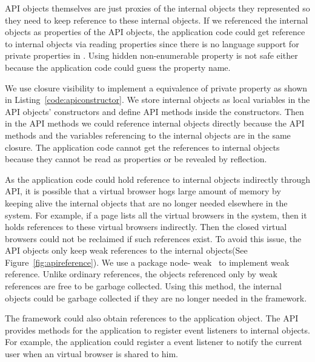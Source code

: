 API objects themselves are just proxies of the internal objects they
represented so they need to keep reference to these internal objects. If we
referenced the internal objects as properties of the API objects, the
application code could get reference to internal objects via reading
properties  since there is no language support for private properties in \js.
Using hidden non-enumerable property is not safe either because the
application code could guess the property name.

We use closure visibility to implement a equivalence of private property as
shown in Listing~\ref{code:apiconstructor}. We store internal objects as local
variables in the API objects' constructors and define API methods inside the
constructors. Then in the API methods we could reference internal objects
directly because the API methods and the variables referencing to the internal
objects are in the same closure. The application code cannot get the
references to internal objects because they cannot be read as properties or be
revealed by reflection.




As the application code could hold reference to internal objects indirectly
through API, it is possible that a virtual browser hogs large amount of memory
by keeping alive the internal objects that are no longer needed elsewhere in
the system.  For example, if a page lists all the virtual browsers in the
system, then it holds references to these virtual browsers indirectly. Then
the closed virtual browsers could not be reclaimed if such references exist.
To avoid this issue, the API objects only keep weak references to the internal
objects(See Figure~\ref{fig:apireference}). We use a \nodejs{} package node-
weak~\cite{nodeweak} to implement weak reference. Unlike ordinary references,
the objects referenced only by weak references are free to be garbage
collected. Using this method, the internal objects could be garbage collected
if they are no longer needed in the framework.


\apireferencefig{}

The framework could also obtain references to the application object. 
The API provides methods for the application to register event listeners to
internal objects.
For example,
the application could register a event listener to notify the current user
when an virtual browser is shared to him.

